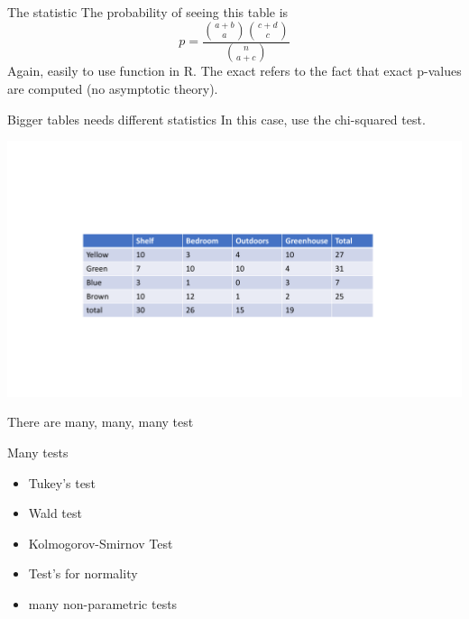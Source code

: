\documentclass{bredelebeamer}
\begin{document}
\begin{frame}{The statistic}
The probability of seeing this table is
\begin{equation}
p = \frac{{a+ b \choose a} { c + d \choose c}}{{n \choose a + c}}
\end{equation}
Again, easily to use function in R. The exact refers to the fact that exact p-values are computed (no asymptotic theory).
\end{frame}

\begin{frame}{Bigger tables needs different statistics}
In this case, use the chi-squared test.

\includegraphics[width=1\textwidth]{chitable}
\end{frame}


\begin{frame}{There are many, many, many test}

\begin{block}{Many tests}
	
\begin{itemize}
\item Tukey's test
\item Wald test
\item Kolmogorov-Smirnov Test
\item Test's for normality
\item many non-parametric tests
\end{itemize}

\end{block}

\end{frame}
\end{document}
